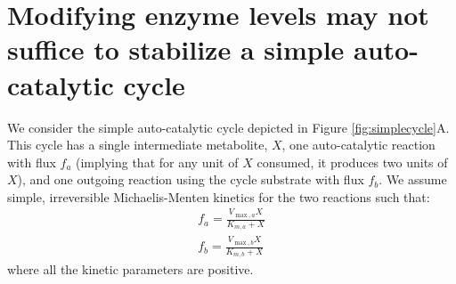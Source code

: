 \documentclass[a4page,notitlepage]{article}
\begin{document}
\section{Modifying enzyme levels may not suffice to stabilize a simple auto-catalytic cycle}
    We consider the simple auto-catalytic cycle depicted in Figure \ref{fig:simplecycle}A.
    This cycle has a single intermediate metabolite, $X$, one auto-catalytic reaction with flux $f_a$ (implying that for any unit of $X$ consumed, it produces two units of $X$), and one outgoing reaction using the cycle substrate with flux $f_b$.
    We assume simple, irreversible Michaelis-Menten kinetics for the two reactions such that:
    \begin{eqnarray*}
      f_a = \frac{V_{\max,a}X}{K_{m,a}+X} \\
      f_b = \frac{V_{\max,b}X}{K_{m,b}+X}
    \end{eqnarray*}
    where all the kinetic parameters are positive.
\end{document}
